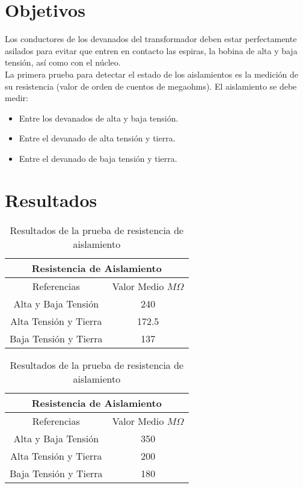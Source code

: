 \documentclass[]{article}
\begin{document}
	\section{Objetivos}
	
	Los conductores de los devanados del transformador deben estar perfectamente asilados para evitar que entren en contacto las espiras, la bobina de alta y baja tensión, así como con el núcleo.\\
	
	La primera prueba para detectar el estado de los aislamientos es la medición de su resistencia (valor de orden de cuentos de megaohms). El aislamiento se debe medir:\\
	
	\begin{itemize}
		\item 	Entre los devanados de alta y baja tensión.
	    \item 	Entre el devanado de alta tensión y tierra.
		\item   Entre el devanado de baja tensión y tierra.
	\end{itemize}

	\section{Resultados}
	
	\begin{table}[h!]\footnotesize
		\caption{Resultados de la prueba de resistencia de aislamiento}
		\centering
		\begin{tabular}{ |c|c| }
			\hline
			\multicolumn{2}{|c|}{Resistencia de Aislamiento} \\
	        \hline
			Referencias & Valor Medio $M \Omega$  \\
			\hline
			Alta y Baja Tensión & 240  \\
			\hline
			Alta Tensión y Tierra & 172.5  \\
			\hline
			Baja Tensión y Tierra & 137  \\
			\hline
		\end{tabular}
    \end{table}
    
    \begin{table}[h!]\footnotesize
    	\caption{Resultados de la prueba de resistencia de aislamiento}
    	\centering
    	\begin{tabular}{ |c|c| }
    		\hline
    		\multicolumn{2}{|c|}{Resistencia de Aislamiento} \\
    		\hline
    		Referencias & Valor Medio $M \Omega$  \\
    		\hline
    		Alta y Baja Tensión & 350  \\
    		\hline
    		Alta Tensión y Tierra & 200  \\
    		\hline
    		Baja Tensión y Tierra & 180  \\
    		\hline
    	\end{tabular}
    \end{table}
    
\end{document}
